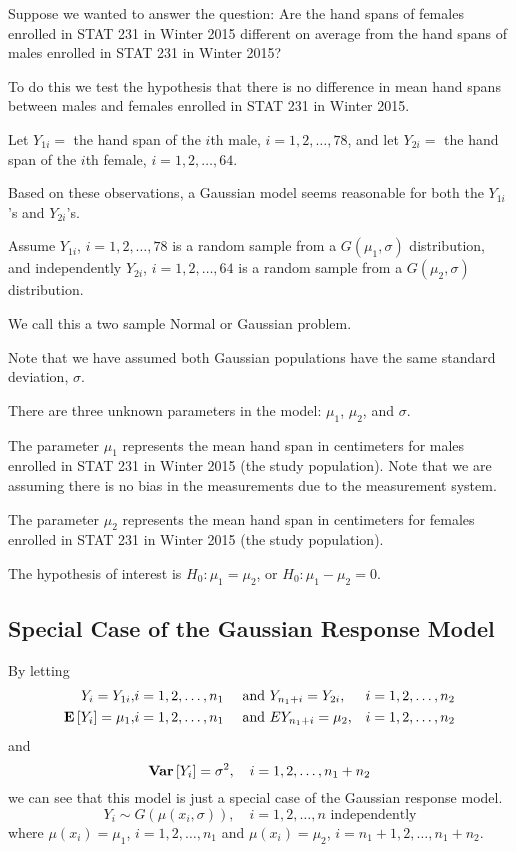\begin{exbox}
    \begin{example}
        Suppose we wanted to answer the question: Are the hand spans of females enrolled
        in STAT 231 in Winter 2015 different on average from the hand spans of males enrolled
        in STAT 231 in Winter 2015?

        To do this we test the hypothesis that there is no difference in mean hand spans
        between males and females enrolled in STAT 231 in Winter 2015.

        Let $ Y_{1i}= $ the hand span of the $ i $th male, $ i=1,2,\ldots ,78 $,
        and let $ Y_{2i}= $ the hand span of the $ i $th female, $ i=1,2,\ldots ,64 $.

        Based on these observations, a Gaussian model seems reasonable for both the $ Y_{1i} $'s
        and $ Y_{2i} $'s.

        Assume $ Y_{1i} $, $ i=1,2,\ldots ,78 $ is a random sample from a $ G(\mu_1,\sigma) $
        distribution, and independently $ Y_{2i} $, $ i=1,2,\ldots ,64 $ is a random
        sample from a $ G(\mu_2,\sigma) $ distribution.

        We call this a two sample Normal or Gaussian problem.

        Note that we have assumed both Gaussian populations have the same standard deviation,
        $ \sigma $.

        There are three unknown parameters in the model: $ \mu_1 $, $ \mu_2 $, and $ \sigma $.

        The parameter $ \mu_1 $ represents the mean hand span in centimeters for males
        enrolled in STAT 231 in Winter 2015 (the study population). Note that we are assuming
        there is no bias in the measurements due to the measurement system.

        The parameter $ \mu_2 $ represents the mean hand span in centimeters for females
        enrolled in STAT 231 in Winter 2015 (the study population).

        The hypothesis of interest is $ H_0:\mu_1=\mu_2 $, or $ H_0:\mu_1-\mu_2=0 $.
    \end{example}
\end{exbox}

\subsection{Special Case of the Gaussian Response Model}
By letting
\[\begin{aligned}
        Y_{i}=Y_{1 i},     & i=1,2, \ldots, n_{1} & \text { and } & Y_{n_{1}+i}=Y_{2 i},    & i=1,2, \ldots, n_{2} \\
        \bm{\mathrm{E}}\left[Y_{i}\right]=\mu_{1}, & i=1,2, \ldots, n_{1} & \text { and } & E{Y_{n_{1}+i}}=\mu_{2}, & i=1,2, \ldots, n_{2}
    \end{aligned}\]
and
\[\bm{\mathrm{Var}}\left[Y_{i}\right]=\sigma^{2}, \quad i=1,2, \ldots, n_{1}+n_{2}\]
we can see that this model is just a special case of the Gaussian response model.
\[ Y_i\sim G\left( \mu(x_i,\sigma) \right),\quad i=1,2,\ldots ,n\text{ independently} \]
where $ \mu(x_i)=\mu_1 $, $ i=1,2,\ldots ,n_1 $ and $ \mu(x_i)=\mu_2 $, $ i=n_1+1,2,\ldots ,n_1+n_2 $.


